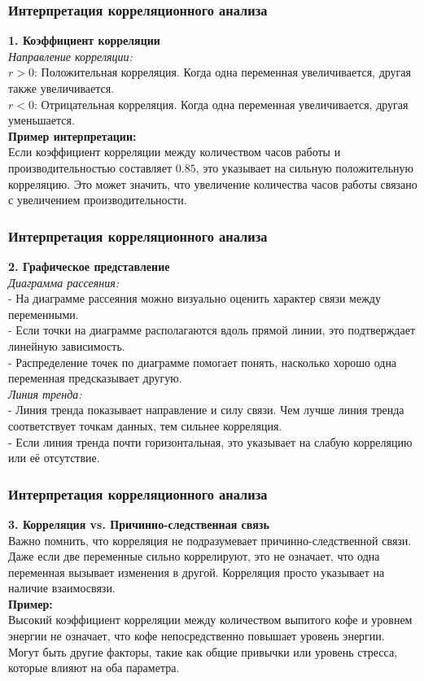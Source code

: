 \documentclass[aspectratio=169]{beamer}
\begin{document}
\begin{frame}
\frametitle{Интерпретация корреляционного анализа}
{\bf 1. Коэффициент корреляции}\\

{\it Направление корреляции:}\\
\quad $r > 0$: Положительная корреляция. Когда одна переменная увеличивается, другая также увеличивается.\\
\quad $r < 0$: Отрицательная корреляция. Когда одна переменная увеличивается, другая уменьшается.\\
{\bf Пример интерпретации:}\\
Если коэффициент корреляции между количеством часов работы и производительностью составляет $0.85$, это указывает на сильную положительную корреляцию. Это может значить, что увеличение количества часов работы связано с увеличением производительности.
\end{frame}

\begin{frame}
\frametitle{Интерпретация корреляционного анализа}
{\bf 2. Графическое представление}\\

{\it Диаграмма рассеяния:}\\
- На диаграмме рассеяния можно визуально оценить характер связи между переменными.\\
- Если точки на диаграмме располагаются вдоль прямой линии, это подтверждает линейную зависимость.\\
- Распределение точек по диаграмме помогает понять, насколько хорошо одна переменная предсказывает другую.
\newline\\
{\it Линия тренда:}\\
- Линия тренда показывает направление и силу связи. Чем лучше линия тренда соответствует точкам данных, тем сильнее корреляция.\\
- Если линия тренда почти горизонтальная, это указывает на слабую корреляцию или её отсутствие.
\end{frame}

\begin{frame}
\frametitle{Интерпретация корреляционного анализа}
{\bf 3. Корреляция vs. Причинно-следственная связь}\\
Важно помнить, что корреляция не подразумевает причинно-следственной связи. Даже если две переменные сильно коррелируют, это не означает, что одна переменная вызывает изменения в другой. Корреляция просто указывает на наличие взаимосвязи.\\
{\bf Пример:}\\
Высокий коэффициент корреляции между количеством выпитого кофе и уровнем энергии не означает, что кофе непосредственно повышает уровень энергии. Могут быть другие факторы, такие как общие привычки или уровень стресса, которые влияют на оба параметра.
\end{frame}
\end{document}
